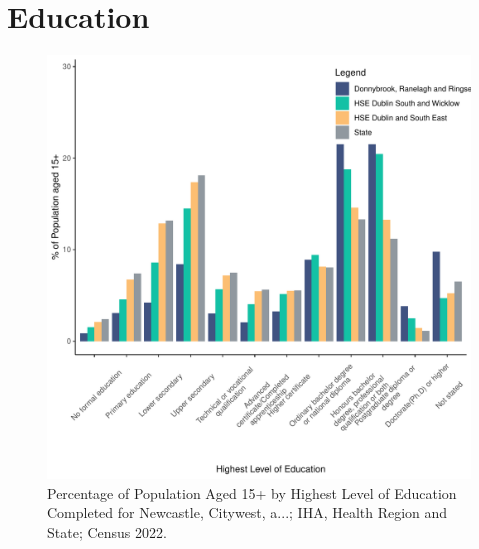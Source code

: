 \documentclass{article}
\begin{document}
\section{Education}\label{sect:Edu}
\begin{figure}[H]
	\centering
	\includegraphics[width = 120mm]{../figures/EduED.pdf}
	\caption{Percentage of Population Aged 15+ by Highest Level of Education Completed for Newcastle, Citywest, a...; IHA, Health Region and State; Census 2022.}
	\label{fig:vbnv}
	\end{figure}
\end{document}
